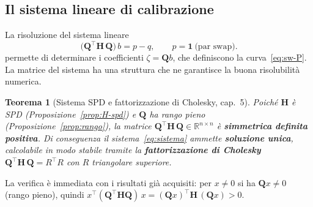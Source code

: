 \documentclass[11pt,a4paper]{article}
\theoremstyle{plain}
\newtheorem{teorema}{Teorema}[section]
\theoremstyle{definition}
\theoremstyle{remark}
\newcommand{\Qmat}{\mathbf{Q}}
\newcommand{\Hmat}{\mathbf{H}}
\newcommand{\transp}{^{\!\top}}
\begin{document}

\subsection{Il sistema lineare di calibrazione}

La risoluzione del sistema lineare
\begin{equation}
  \bigl(\Qmat\transp \Hmat\, \Qmat\bigr)\, b = p - q,
  \qquad p = \mathbf{1}\ \text{(par swap)} .
  \label{eq:sistema}
\end{equation}
permette di determinare i coefficienti $\zeta = \Qmat b$, che definiscono la curva~\eqref{eq:sw-P}.
La matrice del sistema ha una struttura che ne garantisce la buona risolubilit\`a numerica.

\begin{teorema}[Sistema SPD e fattorizzazione di Cholesky, \cite{quarteroni2017} cap.~5]
\label{thm:spd}
Poich\'e $\Hmat$ \`e SPD (Proposizione~\ref{prop:H-spd}) e $\Qmat$ ha rango pieno
(Proposizione~\ref{prop:rango}), la matrice
$\Qmat\transp \Hmat\, \Qmat \in \mathbb{R}^{n\times n}$ \`e \textbf{simmetrica
definita positiva}. Di conseguenza il sistema~\eqref{eq:sistema} ammette \textbf{soluzione
unica}, calcolabile in modo stabile tramite la \textbf{fattorizzazione di Cholesky}
$\Qmat\transp \Hmat\,\Qmat = R\transp R$ con $R$ triangolare superiore.
\end{teorema}

La verifica \`e immediata con i risultati gi\`a acquisiti: per $x\neq 0$ si ha
$\Qmat x\neq 0$ (rango pieno), quindi
$x\transp(\Qmat\transp\Hmat\Qmat)\,x = (\Qmat x)\transp\Hmat\,(\Qmat x) > 0$.


\end{document}
